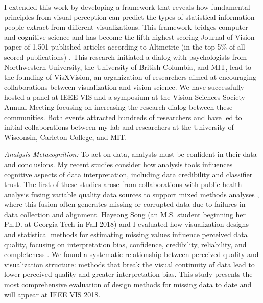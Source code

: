 \documentclass[11pt]{article}
\begin{document}
I extended this work by developing a framework that reveals how fundamental principles from visual perception can predict the types of statistical information people extract from different visualizations. This framework 
bridges computer and cognitive science and has become the fifth highest scoring Journal of Vision paper of 1,501 published articles according to Altmetric (in the top 5\% of all scored publications) \cite{szafir2016Four}. This research initiated a dialog with psychologists from Northwestern University, the University of British Columbia, and MIT, lead to the founding of VisXVision, an organization of researchers aimed at encouraging collaborations between visualization and vision science. We have successfully hosted a panel at IEEE VIS and a symposium at the Vision Sciences Society Annual Meeting focusing on increasing the research dialog between these communities. Both events attracted hundreds of researchers and have led to initial collaborations between my lab and researchers at the University of Wisconsin, Carleton College, and MIT. 

\emph{Analysis Metacognition: }To act on data, analysts must be confident in their data and conclusions. My recent studies 
consider how analysis tools influences cognitive aspects of data interpretation, including data credibility and classifier trust. 
The first of these studies arose from 
collaborations with public health analysis 
fusing variable quality data sources to support mixed methods analyses \cite{pruss2018Zika}, where this fusion often generates
missing or corrupted data due to failures in data collection and alignment. Hayeong Song (an M.S. student beginning her Ph.D. at Georgia Tech in Fall 2018) and I evaluated how visualization designs and statistical methods for estimating missing values influence perceived data quality, focusing on interpretation bias, confidence, credibility, reliability, and completeness \cite{song2019Wheres}. We found a systematic relationship between perceived quality and visualization structure: methods that break the visual continuity of data lead to lower perceived quality and greater interpretation bias. This study presents the most comprehensive evaluation of design methods for missing data to date and will appear at IEEE VIS 2018. 
\end{document}
